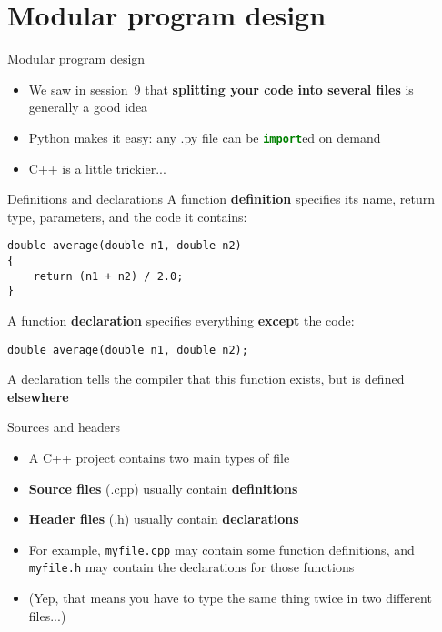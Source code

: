 \part{Modular program design}
\frame{\partpage}

\begin{frame}[fragile]{Modular program design}
    \begin{itemize}
        \item We saw in session~9 that \textbf{splitting your code into several files} is generally a good idea
        \item Python makes it easy: any .py file can be \lstinline[language=Python]{import}ed on demand
        \item C++ is a little trickier...
    \end{itemize}
\end{frame}

\begin{frame}[fragile]{Definitions and declarations}
    A function \textbf{definition} specifies its name, return type, parameters, and the code it contains:
    \begin{lstlisting}
double average(double n1, double n2)
{
    return (n1 + n2) / 2.0;
}
    \end{lstlisting}
    A function \textbf{declaration} specifies everything \textbf{except} the code:
    \begin{lstlisting}
double average(double n1, double n2);
    \end{lstlisting}
    A declaration tells the compiler that this function exists, but is defined \textbf{elsewhere}
\end{frame}

\begin{frame}[fragile]{Sources and headers}
    \begin{itemize}
        \item A C++ project contains two main types of file
        \item \textbf{Source files} (.cpp) usually contain \textbf{definitions}
        \item \textbf{Header files} (.h) usually contain \textbf{declarations}
        \item For example, \texttt{myfile.cpp} may contain some function definitions,
            and \texttt{myfile.h} may contain the declarations for those functions
        \item (Yep, that means you have to type the same thing twice in two different files...)
    \end{itemize}
\end{frame}

